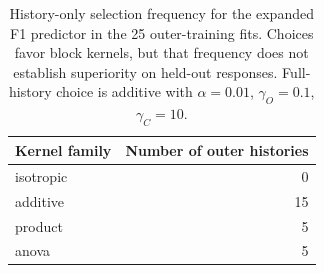 \begin{table}[htbp]\centering\small
\caption{History-only selection frequency for the expanded F1 predictor in the 25 outer-training fits. Choices favor block kernels, but that frequency does not establish superiority on held-out responses. Full-history choice is additive with $\alpha=0.01$, $\gamma_O=0.1$, $\gamma_C=10$.}\label{tab:step10kernels}
\begin{tabular}{lr}\toprule
Kernel family & Number of outer histories \\ \midrule
isotropic & 0 \\
additive & 15 \\
product & 5 \\
anova & 5 \\
\bottomrule\end{tabular}
\end{table}
